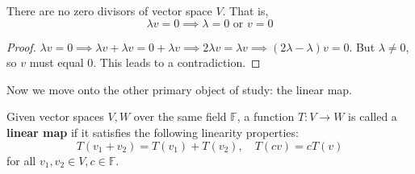   \begin{theorem}
    There are no zero divisors of vector space $V$. That is, 
    \begin{equation}
      \lambda v = 0 \implies \lambda = 0 \text{ or } v = 0
    \end{equation}
  \end{theorem}
  \begin{proof}
    $\lambda v = 0 \implies \lambda v + \lambda v = 0 + \lambda v \implies 2\lambda v = \lambda v \implies (2\lambda - \lambda ) v = 0$. But $\lambda \neq 0$, so $v$ must equal $0$. This leads to a contradiction. 
  \end{proof} 

  Now we move onto the other primary object of study: the linear map. 

  \begin{definition}
    Given vector spaces $V, W$ over the same field $\mathbb{F}$, a function $T: V \longrightarrow W$ is called a \textbf{linear map} if it satisfies the following linearity properties: 
    \begin{equation}
      T(v_1 + v_2) = T(v_1) + T(v_2), \quad T(c v) = c T(v)
    \end{equation}
    for all $v_1, v_2 \in V, c \in \mathbb{F}$. 

    \begin{figure}[H]
      \centering 
\end{figure}
\end{definition}
